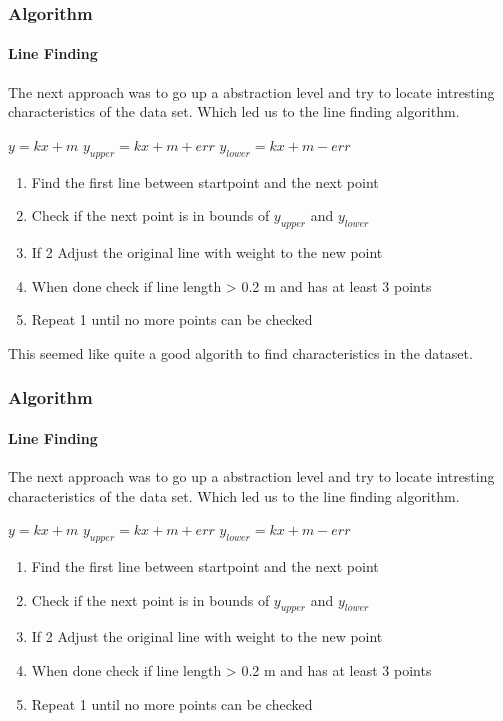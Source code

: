 \documentclass{beamer}
\begin{document}
\begin{frame}
\frametitle{Algorithm}
\framesubtitle{Line Finding}

The next approach was to go up a abstraction level and try to locate intresting characteristics of the data set.
Which led us to the line finding algorithm.
\pause

$y = kx + m$
$y_{upper} = kx + m + err$
$y_{lower} = kx + m - err$
\begin{enumerate}
\pause
\item{Find the first line between startpoint and the next point}
\pause
\item{Check if the next point is in bounds of $y_{upper}$ and $y_{lower}$}
\pause
\item{If 2 Adjust the original line with weight to the new point}
\pause
\item{When done check if line length > 0.2 m and has at least 3 points}
\pause
\item{Repeat 1 until no more points can be checked}
\end{enumerate}

This seemed like quite a good algorith to find characteristics in the dataset.

\end{frame}

\begin{frame}
\frametitle{Algorithm}
\framesubtitle{Line Finding}

The next approach was to go up a abstraction level and try to locate intresting characteristics of the data set.
Which led us to the line finding algorithm.
\pause

$y = kx + m$
$y_{upper} = kx + m + err$
$y_{lower} = kx + m - err$
\begin{enumerate}
\pause
\item{Find the first line between startpoint and the next point}
\pause
\item{Check if the next point is in bounds of $y_{upper}$ and $y_{lower}$}
\pause
\item{If 2 Adjust the original line with weight to the new point}
\pause
\item{When done check if line length > 0.2 m and has at least 3 points}
\pause
\item{Repeat 1 until no more points can be checked}
\end{enumerate}


\end{frame}
\end{document}
